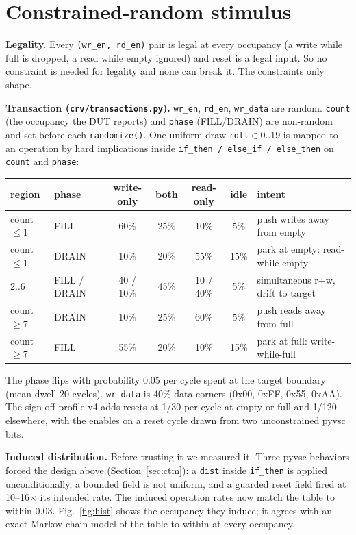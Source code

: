 \documentclass[10pt]{article}
\newcommand{\code}[1]{\texttt{#1}}
\begin{document}
\section{Constrained-random stimulus}
\textbf{Legality.} Every \code{(wr\_en, rd\_en)} pair is legal at every occupancy (a write while full is dropped, a read while empty ignored) and reset is a legal input. So no constraint is needed for legality and none can break it. The constraints only shape.

\textbf{Transaction (\code{crv/transactions.py}).} \code{wr\_en}, \code{rd\_en}, \code{wr\_data} are random. \code{count} (the occupancy the DUT reports) and \code{phase} (FILL/DRAIN) are non-random and set before each \code{randomize()}. One uniform draw \code{roll}$\in$0..19 is mapped to an operation by hard implications inside \code{if\_then / else\_if / else\_then} on \code{count} and \code{phase}:

\begin{center}\small
\begin{tabular}{llcccc l}
\toprule
region & phase & write-only & both & read-only & idle & intent\\
\midrule
count$\le$1 & FILL & 60\% & 25\% & 10\% & 5\% & push writes away from empty\\
count$\le$1 & DRAIN & 10\% & 20\% & 55\% & 15\% & park at empty: read-while-empty\\
2..6 & FILL / DRAIN & 40 / 10\% & 45\% & 10 / 40\% & 5\% & simultaneous r+w, drift to target\\
count$\ge$7 & DRAIN & 10\% & 25\% & 60\% & 5\% & push reads away from full\\
count$\ge$7 & FILL & 55\% & 20\% & 10\% & 15\% & park at full: write-while-full\\
\bottomrule
\end{tabular}
\end{center}

The phase flips with probability 0.05 per cycle spent at the target boundary (mean dwell 20 cycles). \code{wr\_data} is 40\% data corners (0x00, 0xFF, 0x55, 0xAA). The sign-off profile v4 adds resets at 1/30 per cycle at empty or full and 1/120 elsewhere, with the enables on a reset cycle drawn from two unconstrained pyvsc bits.

\textbf{Induced distribution.} Before trusting it we measured it. Three pyvsc behaviors forced the design above (Section~\ref{sec:ctm}): a \code{dist} inside \code{if\_then} is applied unconditionally, a bounded field is not uniform, and a guarded reset field fired at 10--16$\times$ its intended rate. The induced operation rates now match the table to within 0.03. Fig.~\ref{fig:hist} shows the occupancy they induce; it agrees with an exact Markov-chain model of the table to within \HistChainGap{} at every occupancy.
\end{document}
